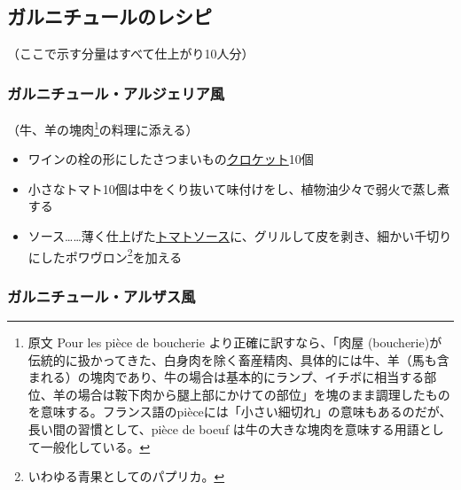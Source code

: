 \hypertarget{garnitures-recettes}{%
\subsection{ガルニチュールのレシピ}\label{garnitures-recettes}}


\begin{center}
\medlarge（ここで示す分量はすべて仕上がり10人分）
\end{center}
\normalsize
\begin{recette}
\hypertarget{garniture-algerienne}{%
\subsubsection{ガルニチュール・アルジェリア風}\label{garniture-algerienne}}



（牛、羊の塊肉\footnote{原文 Pour les pièce de boucherie
  より正確に訳すなら、「肉屋
  (boucherie)が伝統的に扱かってきた、白身肉を除く畜産精肉、具体的には牛、羊（馬も含まれる）の塊肉であり、牛の場合は基本的にランプ、イチボに相当する部位、羊の場合は鞍下肉から腿上部にかけての部位」を塊のまま調理したものを意味する。フランス語のpièceには「小さい細切れ」の意味もあるのだが、長い間の習慣として、pièce
  de boeuf は牛の大きな塊肉を意味する用語として一般化している。}の料理に添える）

\begin{itemize}
\item
  ワインの栓の形にしたさつまいもの\protect\hyperlink{croquettes}{クロケット}10個
\item
  小さなトマト10個は中をくり抜いて味付けをし、植物油少々で弱火で蒸し煮する
\item
  ソース\ldots{}\ldots{}薄く仕上げた\protect\hyperlink{sauce-tomate}{トマトソース}に、グリルして皮を剥き、細かい千切りにしたポワヴロン\footnote{いわゆる青果としてのパプリカ。}を加える
\end{itemize}

\hypertarget{garniture-alsacienne}{%
\subsubsection{ガルニチュール・アルザス風}\label{garniture-alsacienne}}


\end{recette}
